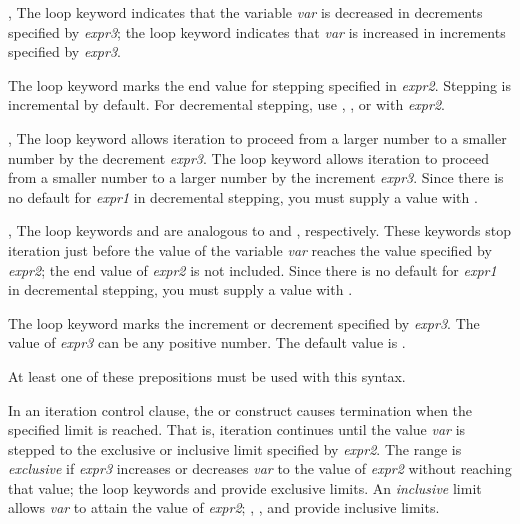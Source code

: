 \begin{new}
\begin{defloop}
\begin{flushdesc}
\item[\cd{downfrom}, \cd{upfrom}]
The loop keyword  
indicates that the variable {\it var\/} is decreased in decrements
specified by {\it expr3}; the loop keyword  indicates that 
{\it var\/} is increased in increments specified by {\it expr3}.

\item[\cd{to}]
The loop keyword  marks the end value for stepping specified in 
{\it expr2}. Stepping is incremental by default.  For
decremental stepping, use ,
, or  with {\it expr2}.

\item[\cd{downto}, \cd{upto}]
The loop keyword  allows iteration to proceed
from a larger number to a smaller number by the decrement 
{\it expr3}.  The loop keyword  allows iteration to proceed
from a smaller number to a larger number by the increment {\it expr3}.
Since there is no default for {\it expr1\/} in decremental stepping,
you must supply a value with .

\item[\cd{below}, \cd{above}]
The loop keywords  and  are analogous to
 and , respectively.  These keywords stop
iteration just before the value of the variable {\it var} reaches the value 
specified by {\it expr2\/}; the end value of {\it expr2\/} is not included.
Since there is no default for {\it expr1\/} in decremental stepping,
you must supply a value with .

\item[\cd{by}]
The loop keyword  marks the increment or decrement specified by
{\it expr3}.  The value of {\it expr3\/} can be any positive number.
The default value is .
\end{flushdesc}

At least one of these prepositions must be used with this syntax.

In an iteration control clause, the  or  construct
causes termination when the specified limit is reached.  That is,
iteration continues until the value {\it var\/} is stepped to the
exclusive or inclusive limit specified by {\it expr2\/}.  The range is
{\it exclusive\/} if {\it expr3\/} increases or decreases {\it var\/}
to the value of {\it expr2\/} without reaching that value; the loop
keywords  and  provide exclusive limits.  An
{\it inclusive\/} limit allows {\it var\/} to attain the value of
{\it expr2}; , , and  provide inclusive
limits.


\end{defloop}
\end{new}
